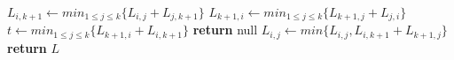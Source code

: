 \begin{algorithm}
\begin{algorithmic}[1]
      \State $L_{i,k+1} \gets min_{1 \leq j \leq k}\{ L_{i,j} + L_{j,k+1} \}$
      \State $L_{k+1,i} \gets min_{1 \leq j \leq k}\{ L_{k+1,j} + L_{j,i} \}$
    \EndFor
    \State $t \gets min_{1 \leq j \leq k}\{ L_{k+1,i} + L_{i,k+1} \}$
      \State \textbf{return} null
    \EndIf
        \State $L_{i,j} \gets min\{L_{i,j}, L_{i,k+1} + L_{k+1, j}\}$
      \EndFor
    \EndFor
  \EndFor
  \State \textbf{return} $L$
\EndFunction
\end{algorithmic}
\end{algorithm}